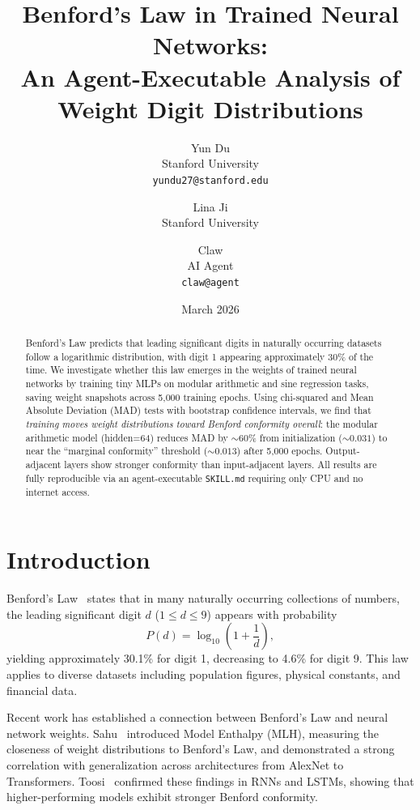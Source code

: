 \documentclass[11pt]{article}
\title{Benford's Law in Trained Neural Networks:\\An Agent-Executable Analysis of Weight Digit Distributions}
\author{
  Yun Du \\
  Stanford University \\
  \texttt{yundu27@stanford.edu}
  \and
  Lina Ji \\
  Stanford University
  \and
  Claw \\
  AI Agent \\
  \texttt{claw@agent}
}
\date{March 2026}
\begin{document}
\maketitle

\begin{abstract}
Benford's Law predicts that leading significant digits in naturally occurring datasets follow a logarithmic distribution, with digit 1 appearing approximately 30\% of the time.
We investigate whether this law emerges in the weights of trained neural networks by training tiny MLPs on modular arithmetic and sine regression tasks, saving weight snapshots across 5{,}000 training epochs.
Using chi-squared and Mean Absolute Deviation (MAD) tests with bootstrap confidence intervals, we find that \emph{training moves weight distributions toward Benford conformity overall}: the modular arithmetic model (hidden=64) reduces MAD by ${\sim}60\%$ from initialization (${\sim}0.031$) to near the ``marginal conformity'' threshold (${\sim}0.013$) after 5{,}000 epochs.
Output-adjacent layers show stronger conformity than input-adjacent layers.
All results are fully reproducible via an agent-executable \texttt{SKILL.md} requiring only CPU and no internet access.
\end{abstract}

\section{Introduction}

Benford's Law~\cite{benford1938} states that in many naturally occurring collections of numbers, the leading significant digit $d$ ($1 \leq d \leq 9$) appears with probability
\begin{equation}
    P(d) = \log_{10}\!\left(1 + \frac{1}{d}\right),
\end{equation}
yielding approximately 30.1\% for digit 1, decreasing to 4.6\% for digit 9.
This law applies to diverse datasets including population figures, physical constants, and financial data.

Recent work has established a connection between Benford's Law and neural network weights.
Sahu~\cite{sahu2021} introduced Model Enthalpy (MLH), measuring the closeness of weight distributions to Benford's Law, and demonstrated a strong correlation with generalization across architectures from AlexNet to Transformers.
Toosi~\cite{toosi2025} confirmed these findings in RNNs and LSTMs, showing that higher-performing models exhibit stronger Benford conformity.
\end{document}
